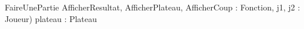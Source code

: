 \begin{algorithme}
	\small
	\fonction
	{FaireUnePartie}
	{AfficherResultat, AfficherPlateau, AfficherCoup : Fonction, j1, j2 : Joueur)}
	{}
	{plateau : Plateau}
	{
	}
\end{algorithme}
